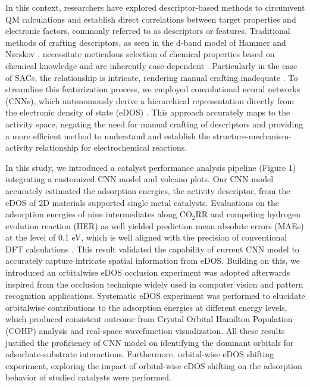 In this context, researchers have explored descriptor-based methods to circumvent QM calculations and establish direct correlations between target properties and electronic factors, commonly referred to as descriptors or features.
Traditional methods of crafting descriptors, as seen in the d-band model of Hammer and Nørskov \cite{hammer1995electronic}, necessitate meticulous selection of chemical properties based on chemical knowledge and are inherently case-dependent \cite{kajita2017universal}.
Particularly in the case of SACs, the relationship is intricate, rendering manual crafting inadequate \cite{han2021single, thirumalai2018investigating}.
To streamline this featurization process, we employed convolutional neural networks (CNNs), which autonomously derive a hierarchical representation directly from the electronic density of state (eDOS) \cite{tran2015learning, socher2012convolutional, krizhevsky2012imagenet}.
This approach accurately maps to the activity space, negating the need for manual crafting of descriptors and providing a more efficient method to understand and establish the structure-mechanism-activity relationship for electrochemical reactions.

In this study, we introduced a catalyst performance analysis pipeline (Figure 1) integrating a customized CNN model and volcano plots.
Our CNN model accurately estimated the adsorption energies, the activity descriptor, from the eDOS of 2D materials supported single metal catalysts.
Evaluations on the adsorption energies of nine intermediates along CO$_2$RR and competing hydrogen evolution reaction (HER) as well yielded prediction mean absolute errors (MAEs) at the level of 0.1 eV, which is well aligned with the precision of conventional DFT calculations \cite{kirklin2015open, lejaeghere2016reproducibility, wellendorff2015benchmark}.
This result validated the capability of current CNN model to accurately capture intricate spatial information from eDOS.
Building on this, we introduced an orbitalwise eDOS occlusion experiment was adopted afterwards inspired from the occlusion technique widely used in computer vision and pattern recognition applications.
Systematic eDOS experiment was performed to elucidate orbitalwise contributions to the adsorption energies at different energy levels, which produced consistent outcome from Crystal Orbital Hamilton Population (COHP) analysis and real-space wavefunction visualization.
All these results justified the proficiency of CNN model on identifying the dominant orbitals for adsorbate-substrate interactions.
Furthermore, orbital-wise eDOS shifting experiment, exploring the impact of orbital-wise eDOS shifting on the adsorption behavior of studied catalysts were performed.

